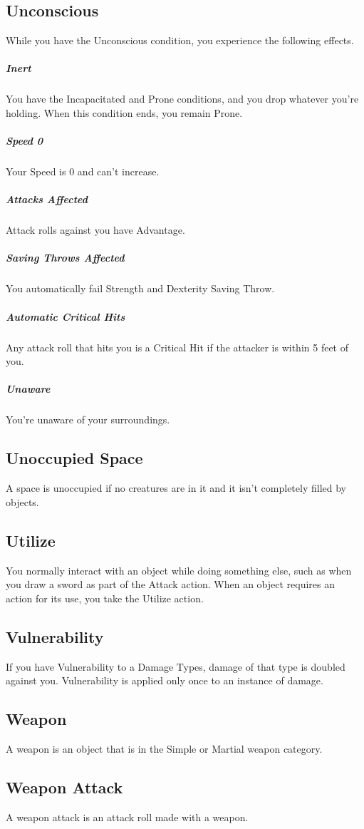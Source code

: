 \documentclass[10pt,a4paper,twoside,bg=print,twocolumn,openany,nodeprecatedcode]{dndarticle}
\begin{document}
\subsection{Unconscious}
While you have the Unconscious condition, you experience the following effects.

\subparagraph{Inert}
You have the Incapacitated and Prone conditions, and you drop whatever you're holding. When this condition ends, you remain Prone.

\subparagraph{Speed 0}
Your Speed is 0 and can't increase.

\subparagraph{Attacks Affected}
Attack rolls against you have Advantage.

\subparagraph{Saving Throws Affected}
You automatically fail Strength and Dexterity Saving Throw.

\subparagraph{Automatic Critical Hits}
Any attack roll that hits you is a Critical Hit if the attacker is within 5 feet of you.

\subparagraph{Unaware}
You're unaware of your surroundings.

\subsection{Unoccupied Space}
A space is unoccupied if no creatures are in it and it isn't completely filled by objects.

\subsection{Utilize}
You normally interact with an object while doing something else, such as when you draw a sword as part of the Attack action. When an object requires an action for its use, you take the Utilize action.

\subsection{Vulnerability}
If you have Vulnerability to a Damage Types, damage of that type is doubled against you. Vulnerability is applied only once to an instance of damage.

\subsection{Weapon}
A weapon is an object that is in the Simple or Martial weapon category.

\subsection{Weapon Attack}
A weapon attack is an attack roll made with a weapon.
\end{document}
